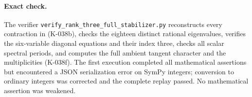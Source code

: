\paragraph{Exact check.}
The verifier
\nolinkurl{verify_rank_three_full_stabilizer.py}
reconstructs every contraction in (K-038b), checks
the eighteen distinct rational eigenvalues, verifies
the six-variable diagonal equations and their index
three, checks all scalar spectral periods, and
computes the full ambient tangent character and
the multiplicities (K-038f).
The first execution completed all mathematical
assertions but encountered a JSON serialization
error on SymPy integers; conversion to ordinary
integers was corrected and the complete replay
passed. No mathematical assertion was weakened.

